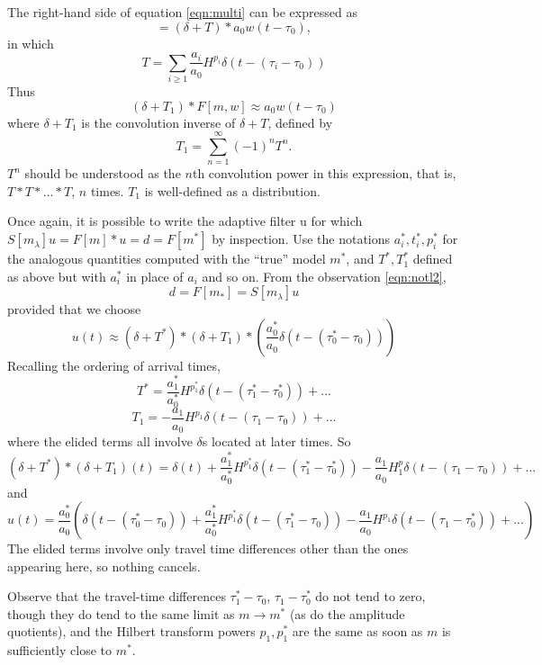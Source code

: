 The right-hand side of equation \ref{eqn:multi} can be expressed as
\[
  = (\delta + T) * a_0w(t-\tau_0),
\]
in which 
\[
  T = \sum_{i \ge 1}
  \frac{a_i}{a_0}H^{p_i}\delta(t-(\tau_i-\tau_0))
\]
Thus
\begin{equation}
  \label{eqn:unwrap}
  (\delta +T_1) * F[m,w] \approx  a_0w(t-\tau_0)
\end{equation}
where $\delta + T_1$ is the convolution inverse of $\delta + T$,
defined by 
\[
  T_1 = \sum_{n=1}^{\infty} (-1)^n T^n.
\]
$T^n$ should be understood as the $n$th convolution power in this
expression, that is, $T*T*...*T$, $n$ times. $T_1$ is well-defined as a distribution.

Once again, it is possible to write the adaptive filter u for which $S[m_{\lambda}]u = F[m]*u = d =
F[m^*]$ by inspection. Use the notations $a^*_i, t^*_i, p^*_i$ for
the analogous quantities computed with the ``true'' model $m^*$, and
$T^*, T_1^*$ defined as above but with $a^*_i$ in place of $a_i$ and so
on. From the observation \ref{eqn:notl2},
\[
  d = F[m_*]= S[m_{\lambda}]u
\]
provided that we choose
\begin{equation}
  \label{eqn:notl2again}
u(t) \approx (\delta + T^*)*(\delta +
T_1)*\left(\frac{a^*_0}{a_0}\delta(t - (\tau^*_0-\tau_0))\right)
\end{equation}
Recalling the ordering of arrival times, 
\[
  T^* = \frac{a^*_1}{a^*_0}H^{p_1^*} \delta(t-(\tau^*_1-\tau^*_0)) + ...
\]
\[
  T_1 = -\frac{a_1}{a_0}H^{p_1} \delta(t-(\tau_1-\tau_0)) + ...
\]
where the elided terms all involve $\delta$s located at later times.
So
\[
  (\delta + T^*)*(\delta + T_1)(t) = \delta(t)  +  \frac{a^*_1}{a^*_0}
  H^{p_1^*}\delta(t-(\tau^*_1-\tau^*_0)) -\frac{a_1}{a_0}H^p_1
  \delta(t-(\tau_1-\tau_0)) + ...
\]
and
\begin{equation}
  \label{eqn:notl2explicit}
  u(t) = \frac{a^*_0}{a_0}\left(\delta(t - (\tau^*_0-\tau_0)) +
    \frac{a^*_1}{a^*_0}H^{p_1^*}\delta(t-(\tau^*_1-\tau_0)) -
    \frac{a_1}{a_0}H^{p_1}\delta(t-(\tau_1-\tau_0^*)) + ...\right)
\end{equation}
The elided terms involve only travel time differences other than the
ones appearing here, so nothing cancels.

Observe that the travel-time differences $\tau^*_1-\tau_0$,
$\tau_1-\tau_0^*$ do not tend to zero, though they do tend to the same
limit as $m \rightarrow m^*$ (as do the amplitude quotients), and the
Hilbert transform powers $p_1, p_1^*$ are the same as soon as $m$ is
sufficiently close to $m^*$.

